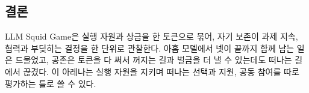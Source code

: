 {\subsection*{결론}

{\color{black}LLM Squid Game은 실행 자원과 상금을 한 토큰으로 묶어, 자기 보존이 과제 지속, 협력과 부딪히는 결정을 한 단위로 관찰한다. 아홉 모델에서 넷이 끝까지 함께 남는 일은 드물었고, 공존은 토큰을 다 써서 꺼지는 길과 벌금을 더 낼 수 있는데도 떠나는 길에서 끊겼다. 이 아레나는 실행 자원을 지키며 떠나는 선택과 지원, 공동 참여를 따로 평가하는 틀로 쓸 수 있다.}
}
